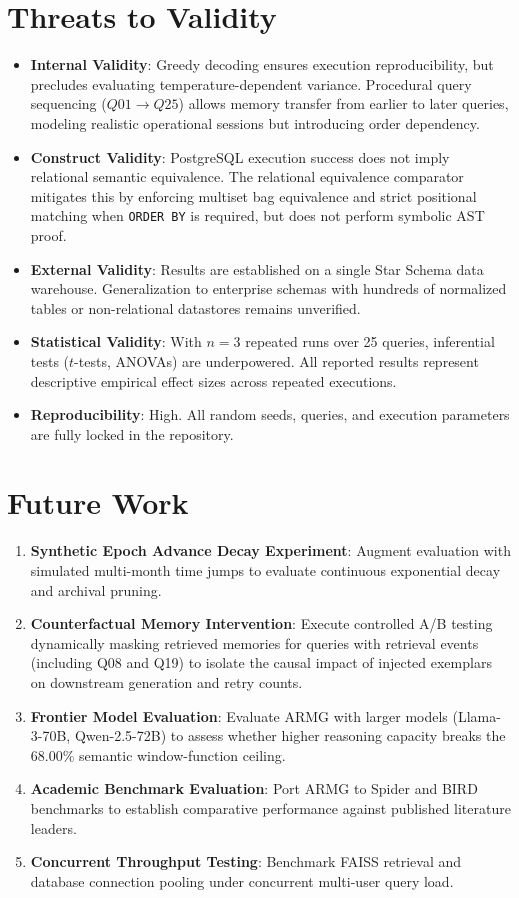 \documentclass[conference]{IEEEtran}
\begin{document}
\section{Threats to Validity}
\begin{itemize}
    \item \textbf{Internal Validity}: Greedy decoding ensures execution reproducibility, but precludes evaluating temperature-dependent variance. Procedural query sequencing ($Q01 \to Q25$) allows memory transfer from earlier to later queries, modeling realistic operational sessions but introducing order dependency.
    \item \textbf{Construct Validity}: PostgreSQL execution success does not imply relational semantic equivalence. The relational equivalence comparator mitigates this by enforcing multiset bag equivalence and strict positional matching when \texttt{ORDER BY} is required, but does not perform symbolic AST proof.
    \item \textbf{External Validity}: Results are established on a single Star Schema data warehouse. Generalization to enterprise schemas with hundreds of normalized tables or non-relational datastores remains unverified.
    \item \textbf{Statistical Validity}: With $n = 3$ repeated runs over 25 queries, inferential tests ($t$-tests, ANOVAs) are underpowered. All reported results represent descriptive empirical effect sizes across repeated executions.
    \item \textbf{Reproducibility}: High. All random seeds, queries, and execution parameters are fully locked in the repository.
\end{itemize}

\section{Future Work}
\begin{enumerate}
    \item \textbf{Synthetic Epoch Advance Decay Experiment}: Augment evaluation with simulated multi-month time jumps to evaluate continuous exponential decay and archival pruning.
    \item \textbf{Counterfactual Memory Intervention}: Execute controlled A/B testing dynamically masking retrieved memories for queries with retrieval events (including Q08 and Q19) to isolate the causal impact of injected exemplars on downstream generation and retry counts.
    \item \textbf{Frontier Model Evaluation}: Evaluate ARMG with larger models (Llama-3-70B, Qwen-2.5-72B) to assess whether higher reasoning capacity breaks the 68.00\% semantic window-function ceiling.
    \item \textbf{Academic Benchmark Evaluation}: Port ARMG to Spider and BIRD benchmarks to establish comparative performance against published literature leaders.
    \item \textbf{Concurrent Throughput Testing}: Benchmark FAISS retrieval and database connection pooling under concurrent multi-user query load.
\end{enumerate}
\end{document}
